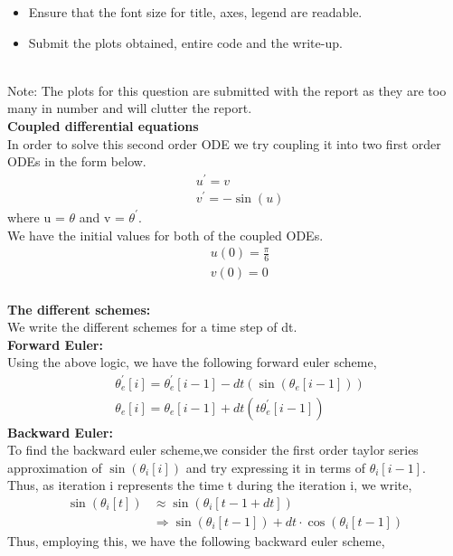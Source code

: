 \documentclass[letterpaper]{exam}
\begin{document}
\begin{questions}
\begin{itemize}
    \item Ensure that the font size for title, axes, legend are readable.
    \item Submit the plots obtained, entire code and the write-up.
\end{itemize}
\begin{solution}
\\
Note: The plots for this question are submitted with the report as they are too many in number and will clutter the report.\\
\textbf{Coupled differential equations}\\
In order to solve this second order ODE we try coupling it into two first order ODEs in the form below.
\begin{align}
    &u^{'} = v\\
    &v^{'} = -\sin{(u)}
\end{align}
where u = $\theta$ and v = $\theta^{'}$.\\
We have the initial values for both of the coupled ODEs.\\
\begin{align}
    &u(0) = \frac{\pi}{6}\\
    &v(0) = 0
\end{align}
\\
\textbf{The different schemes:}\\
We write the different schemes for a time step of dt.\\
\textbf{Forward Euler:}\\
Using the above logic, we have the following forward euler scheme,
\begin{align}
    &\theta^{'}_e[i] = \theta^{'}_e[i-1] - dt(\sin{(\theta_e[i-1])})\\
    &\theta_e[i]      = \theta_e[i-1] + dt(t\theta^{'}_e[i-1])
\end{align}
\textbf{Backward Euler:}\\
To find the backward euler scheme,we consider the first order taylor series approximation of $\sin{(\theta_i[i])}$ and try expressing it in terms of $\theta_i[i-1]$.\\
Thus, as iteration i represents the time t during the iteration i, we write,
\begin{align*}
   \sin{(\theta_i[t])} &\approx \sin{(\theta_i[t-1 + dt])}\\
   &\Rightarrow
   \sin{(\theta_i[t-1])} + dt\cdot\cos{(\theta_i[t-1])}
\end{align*}
Thus, employing this, we have the following backward euler scheme,

\end{solution}
\end{questions}
\end{document}
